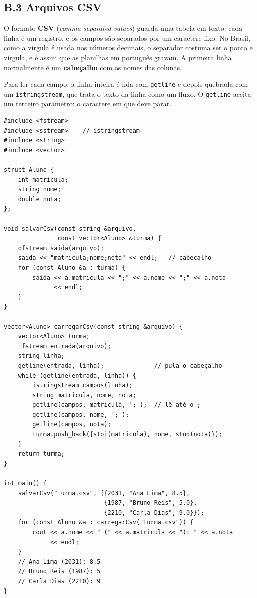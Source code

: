 \subsection{B.3 Arquivos CSV}

O formato \textbf{CSV} (\textit{comma-separated values}) guarda uma tabela em texto: cada linha é um registro, e os campos são separados por um caractere fixo. No Brasil, como a vírgula é usada nos números decimais, o separador costuma ser o ponto e vírgula, e é assim que as planilhas em português gravam. A primeira linha normalmente é um \textbf{cabeçalho} com os nomes das colunas.

Para ler cada campo, a linha inteira é lida com \texttt{getline} e depois quebrada com um \texttt{istringstream}, que trata o texto da linha como um fluxo. O \texttt{getline} aceita um terceiro parâmetro: o caractere em que deve parar.

\begin{codigo}
\begin{Verbatim}[breaklines=true, breaksymbolleft={}, fontsize=\footnotesize]
#include <fstream>
#include <sstream>    // istringstream
#include <string>
#include <vector>

struct Aluno {
    int matricula;
    string nome;
    double nota;
};

void salvarCsv(const string &arquivo,
               const vector<Aluno> &turma) {
    ofstream saida(arquivo);
    saida << "matricula;nome;nota" << endl;   // cabeçalho
    for (const Aluno &a : turma) {
        saida << a.matricula << ";" << a.nome << ";" << a.nota
              << endl;
    }
}

vector<Aluno> carregarCsv(const string &arquivo) {
    vector<Aluno> turma;
    ifstream entrada(arquivo);
    string linha;
    getline(entrada, linha);              // pula o cabeçalho
    while (getline(entrada, linha)) {
        istringstream campos(linha);
        string matricula, nome, nota;
        getline(campos, matricula, ';');  // lê até o ;
        getline(campos, nome, ';');
        getline(campos, nota);
        turma.push_back({stoi(matricula), nome, stod(nota)});
    }
    return turma;
}

int main() {
    salvarCsv("turma.csv", {{2031, "Ana Lima", 8.5},
                            {1987, "Bruno Reis", 5.0},
                            {2210, "Carla Dias", 9.0}});
    for (const Aluno &a : carregarCsv("turma.csv")) {
        cout << a.nome << " (" << a.matricula << "): " << a.nota
             << endl;
    }
    // Ana Lima (2031): 8.5
    // Bruno Reis (1987): 5
    // Carla Dias (2210): 9
}
\end{Verbatim}
\end{codigo}

